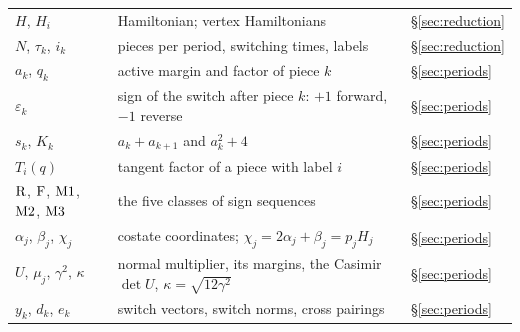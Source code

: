 \begin{longtable}{@{}p{}p{}p{}@{}}
$H$, $H_i$ & Hamiltonian; vertex Hamiltonians & \S\ref{sec:reduction}\\
$N$, $\tau_k$, $i_k$ & pieces per period, switching times, labels & \S\ref{sec:reduction}\\
$a_k$, $q_k$ & active margin and factor of piece $k$ & \S\ref{sec:periods}\\
$\varepsilon_k$ & sign of the switch after piece $k$: $+1$ forward, $-1$ reverse & \S\ref{sec:periods}\\
$s_k$, $K_k$ & $a_k+a_{k+1}$ and $a_k^2+4$ & \S\ref{sec:periods}\\
$T_i(q)$ & tangent factor of a piece with label $i$ & \S\ref{sec:periods}\\
$\mathrm{R}$, $\mathrm{F}$, $\mathrm{M1}$, $\mathrm{M2}$, $\mathrm{M3}$ & the five classes of sign sequences & \S\ref{sec:periods}\\
$\alpha_j$, $\beta_j$, $\chi_j$ & costate coordinates; $\chi_j=2\alpha_j+\beta_j=p_jH_j$ & \S\ref{sec:periods}\\
$U$, $\mu_j$, $\gamma^2$, $\kappa$ & normal multiplier, its margins, the Casimir $\det U$, $\kappa=\sqrt{12\gamma^2}$ & \S\ref{sec:periods}\\
$y_k$, $d_k$, $e_k$ & switch vectors, switch norms, cross pairings & \S\ref{sec:periods}\\
\end{longtable}
